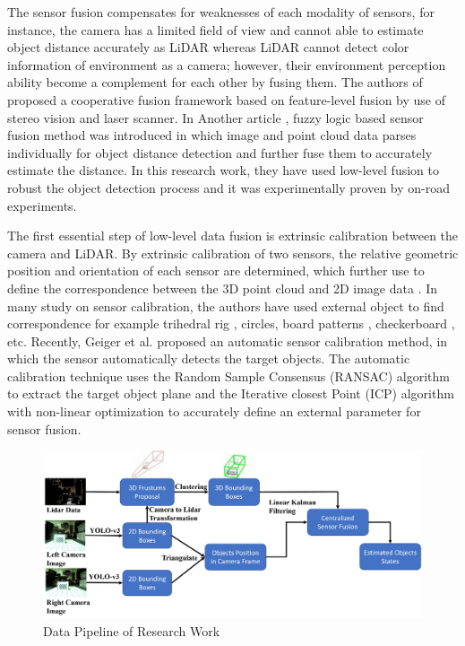 The sensor fusion compensates for weaknesses of each modality of sensors, for instance, the camera has a limited field of view and cannot able to estimate object distance accurately as LiDAR whereas LiDAR cannot detect color information of environment as a camera; however, their environment perception ability become a complement for each other by fusing them. The authors of \cite{labayrade} proposed a cooperative fusion framework based on feature-level fusion by use of stereo vision and laser scanner. In Another article \cite{shi2018}, fuzzy logic based sensor fusion method was introduced in which image and point cloud data parses individually for object distance detection and further fuse them to accurately estimate the distance. In this research work, they have used low-level fusion to robust the object detection process and it was experimentally proven by on-road experiments. 

The first essential step of low-level data fusion is extrinsic calibration between the camera and LiDAR. By extrinsic calibration of two sensors, the relative geometric position and orientation of each sensor are determined, which further use to define the correspondence between the 3D point cloud and 2D image data \cite{zhao2014,li2015,li20152}. In many study on sensor calibration, the authors have used external object to find correspondence for example trihedral rig \cite{mastin2009,gong2013,alismail2012}, circles, board patterns \cite{park2014,garcia2013}, checkerboard \cite{verma2019}, etc. Recently, Geiger et al. \cite{geiger2012} proposed an automatic sensor calibration method, in which the sensor automatically detects the target objects. The automatic calibration technique uses the Random Sample Consensus (RANSAC) algorithm to extract the target object plane and the Iterative closest Point (ICP) algorithm with non-linear optimization to accurately define an external parameter for sensor fusion.   

\begin{figure}
    \includegraphics[scale=0.18]{Images/Datapipeline.png}
    \caption{Data Pipeline of Research Work}
    \label{Datapipeline}
\end{figure}

